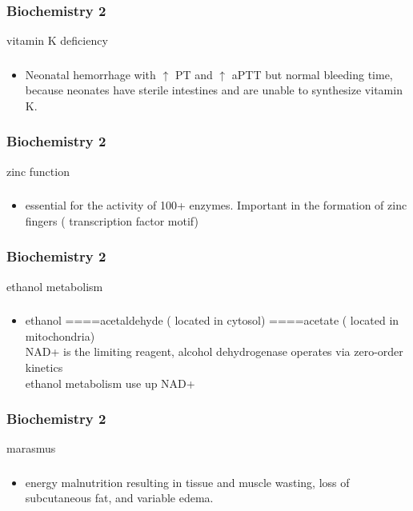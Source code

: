 \documentclass[11pt]{beamer}
\begin{document}
\begin{frame}
 \frametitle{Biochemistry 2}
vitamin K deficiency 
\end{frame}

\begin{frame}
 \frametitle{}
\begin{itemize}
\item Neonatal hemorrhage with ${\uparrow}$ PT and ${\uparrow}$ aPTT but normal bleeding time, because neonates have sterile intestines and are unable to synthesize vitamin K.
\end{itemize}
\end{frame}

\begin{frame}
 \frametitle{Biochemistry 2}
zinc function 
\end{frame}

\begin{frame}
 \frametitle{}
\begin{itemize}
\item essential for the activity of 100+ enzymes. Important in the formation of zinc fingers ( transcription factor motif) 
\end{itemize}
\end{frame}

\begin{frame}
 \frametitle{Biochemistry 2}
ethanol metabolism 
\end{frame}

\begin{frame}
 \frametitle{}
\begin{itemize}
\item ethanol ====acetaldehyde ( located in cytosol) ====acetate ( located in mitochondria)  \\ NAD+ is the limiting reagent, alcohol dehydrogenase operates via zero-order kinetics  \\ ethanol metabolism use up NAD+ 
\end{itemize}
\end{frame}

\begin{frame}
 \frametitle{Biochemistry 2}
marasmus 
\end{frame}

\begin{frame}
 \frametitle{}
\begin{itemize}
\item energy malnutrition resulting in tissue and muscle wasting, loss of subcutaneous fat, and variable edema. 
\end{itemize}
\end{frame}
\end{document}
